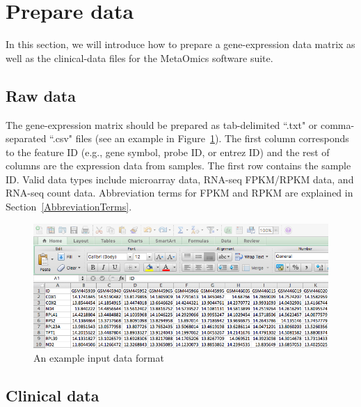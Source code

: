 
\section{Prepare data}
\label{sec:dataPrepare}
In this section, we will introduce how to prepare a gene-expression data matrix as well as the clinical-data files for the MetaOmics software suite.

\subsection{Raw data}

The gene-expression matrix should be prepared as tab-delimited ``.txt" or comma-separated ``.csv" files (see an example in Figure~\ref{fig:dataMicroarray}).
The first column corresponds to the feature ID (e.g., gene symbol, probe ID, or entrez ID) and the rest of columns are the expression data from samples.
The first row contains the sample ID.
Valid data types include microarray data, RNA-seq FPKM/RPKM data,
and RNA-seq count data.
Abbreviation terms for FPKM and RPKM are explained in Section~\ref{AbbreviationTerms}.

\begin{figure}[H]
\begin{center}
\includegraphics[scale=0.5]{./figure/dataPreparation/dataMicroarray_wide}
\caption{An example input data format}
\label{fig:dataMicroarray}
\end{center}
\end{figure}

\subsection{Clinical data}

